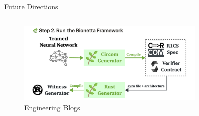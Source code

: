 \documentclass{zkdl-presentation-template}
\begin{document}
    \begin{frame}{Future Directions}
        \setlength{\fboxrule}{1.5pt}
            \begin{columns}
                \begin{column}{0.5\textwidth}
                    \begin{figure}
                        \centering
                        \includegraphics[width=0.8\textwidth]{images/media_enginnering_blog.png}
                        \caption{Engineering Blogs}
                    \end{figure}
                \end{column}
            

\end{columns}
\end{frame}
\end{document}
